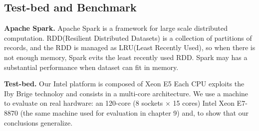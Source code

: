 \ifkor
\else

\fi



\subsection{Test-bed and Benchmark}

\ifkor
\noindent
\textbf{Apache Spark. }
Apache Spark is a framework for large scale distributed computation.
RDD(Resilient Distributed Datasets) is a collection of partitions of records, 
and the RDD is managed as LRU(Least Recently Used), so when there is not enough
memory, Spark evits the least recently used RDD.
Spark may has a substantial performance when dataset can fit in memory.


\else
\fi

\ifkor
\noindent
\textbf{Test-bed. }
Our Intel platform is composed of Xeon E5 Each CPU exploits the Iby Brige
technoloy and consists in a multi-core architecture.
We use a machine to evaluate on real hardware: an 120-core (8 sockets × 15
cores) Intel Xeon E7-8870 (the same machine used for evaluation in chapter 9)
and, to show that our conclusions generalize.

